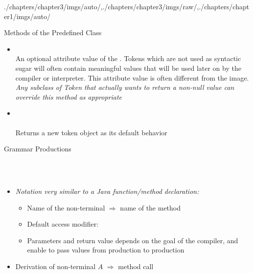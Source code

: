 \begin{graphicspathcontext}{{./chapters/chapter3/imgs/auto/},{./chapters/chapter3/imgs/raw/},{./chapters/chapter1/imgs/auto/}}
\begin{bibunit}[apalike]
\begin{frame}{Methods of the Predefined  Class}
	\begin{itemize}
	\item {} \\
		An optional attribute value of the . Tokens which are not used as syntactic sugar will often contain meaningful values that will be used later on by the compiler or interpreter. This attribute value is often different from the image. \emph{Any subclass of Token that actually wants to return a non-null value can override this method as appropriate}
	\vfill
	\item {} \\
		 \\
		Returns a new token object as its default behavior
	\end{itemize}
\end{frame}

\begin{frame}[t]{Grammar Productions}
	\begin{definition}\small
		 \\
		 \\
	\end{definition}
	\begin{itemize}
	\item \emph{Notation very similar to a Java function/method declaration:}
		\begin{itemize}
		\item Name of the non-terminal $\Rightarrow$ name of the method
		\item Default access modifier: 
		\item Parameters and return value depends on the goal of the compiler, and enable to pass values from production to production
		\end{itemize}
	\item Derivation of non-terminal $A$ $\Rightarrow$ method call 
	\end{itemize}
\end{frame}


\end{bibunit}
\end{graphicspathcontext}
